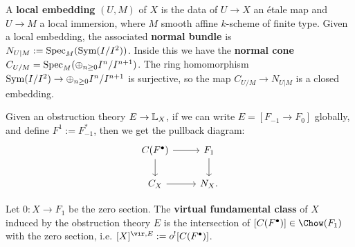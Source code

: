\begin{defin}
A \textbf{local embedding} $(U,M)$ of $X$ is the data of $U\to X$ an \'etale map and $U\to M$ a local immersion, 
where $M$ smooth affine $k$-scheme of finite type.
Given a local embedding, the associated \textbf{normal bundle} is $N_{U|M} := \operatorname{Spec}_M(\operatorname{Sym} (I/I^2))$. Inside this 
we have the \textbf{normal cone} $C_{U/M} = \operatorname{Spec}_M(\oplus_{n\geq 0} I^n/I^{n+1})$.
The ring homomorphism $\operatorname{Sym} (I/I^2) \to \oplus_{n\geq 0} I^n/I^{n+1}$ is surjective, so the map
$C_{U/M}	\to N_{U|M}$ is a closed embedding.
\end{defin}

Given an obstruction theory $E \to \mathbb L_X$, if we can write $E = [F_{-1} \to F_0]$ globally, and define $F^1 := F_{-1}^*$, 
then we get the pullback diagram:
\[
\begin{tikzcd}
C(F^{\bullet})\arrow{r}\arrow{d} & F_1\arrow{d} \\ C_X \arrow{r} & N_X .
\end{tikzcd}
\]

\begin{defin}
Let $0: X \to F_1$ be the zero section.
The \textbf{virtual fundamental class} of $X$ induced by the obstruction theory $E$ is the intersection of
$[C(F^{\bullet})] \in \Chow(F_1)$ with the zero section, i.e. $[X]^{\vir, E} := o^{!}[C(F^{\bullet})]$.
\end{defin}

